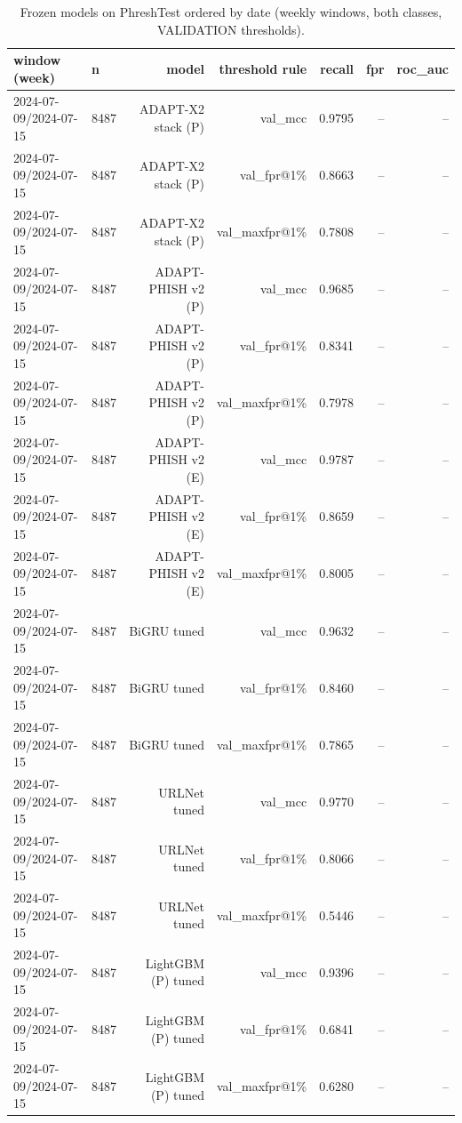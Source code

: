 \begin{table}[t]
\centering
\scriptsize
\caption{Frozen models on PhreshTest ordered by date (weekly windows, both classes, VALIDATION thresholds).}
\label{tab:rev_R18_forward_in_time_frozen_per_week}
\begin{tabular}{llrrrrr}
\toprule
window (week) & n & model & threshold rule & recall & fpr & roc\_auc \\
\midrule
2024-07-09/2024-07-15 & 8487 & ADAPT-X2 stack (P) & val\_mcc & 0.9795 & -- & -- \\
2024-07-09/2024-07-15 & 8487 & ADAPT-X2 stack (P) & val\_fpr@1\% & 0.8663 & -- & -- \\
2024-07-09/2024-07-15 & 8487 & ADAPT-X2 stack (P) & val\_maxfpr@1\% & 0.7808 & -- & -- \\
2024-07-09/2024-07-15 & 8487 & ADAPT-PHISH v2 (P) & val\_mcc & 0.9685 & -- & -- \\
2024-07-09/2024-07-15 & 8487 & ADAPT-PHISH v2 (P) & val\_fpr@1\% & 0.8341 & -- & -- \\
2024-07-09/2024-07-15 & 8487 & ADAPT-PHISH v2 (P) & val\_maxfpr@1\% & 0.7978 & -- & -- \\
2024-07-09/2024-07-15 & 8487 & ADAPT-PHISH v2 (E) & val\_mcc & 0.9787 & -- & -- \\
2024-07-09/2024-07-15 & 8487 & ADAPT-PHISH v2 (E) & val\_fpr@1\% & 0.8659 & -- & -- \\
2024-07-09/2024-07-15 & 8487 & ADAPT-PHISH v2 (E) & val\_maxfpr@1\% & 0.8005 & -- & -- \\
2024-07-09/2024-07-15 & 8487 & BiGRU tuned & val\_mcc & 0.9632 & -- & -- \\
2024-07-09/2024-07-15 & 8487 & BiGRU tuned & val\_fpr@1\% & 0.8460 & -- & -- \\
2024-07-09/2024-07-15 & 8487 & BiGRU tuned & val\_maxfpr@1\% & 0.7865 & -- & -- \\
2024-07-09/2024-07-15 & 8487 & URLNet tuned & val\_mcc & 0.9770 & -- & -- \\
2024-07-09/2024-07-15 & 8487 & URLNet tuned & val\_fpr@1\% & 0.8066 & -- & -- \\
2024-07-09/2024-07-15 & 8487 & URLNet tuned & val\_maxfpr@1\% & 0.5446 & -- & -- \\
2024-07-09/2024-07-15 & 8487 & LightGBM (P) tuned & val\_mcc & 0.9396 & -- & -- \\
2024-07-09/2024-07-15 & 8487 & LightGBM (P) tuned & val\_fpr@1\% & 0.6841 & -- & -- \\
2024-07-09/2024-07-15 & 8487 & LightGBM (P) tuned & val\_maxfpr@1\% & 0.6280 & -- & -- \\

\end{tabular}
\end{table}
